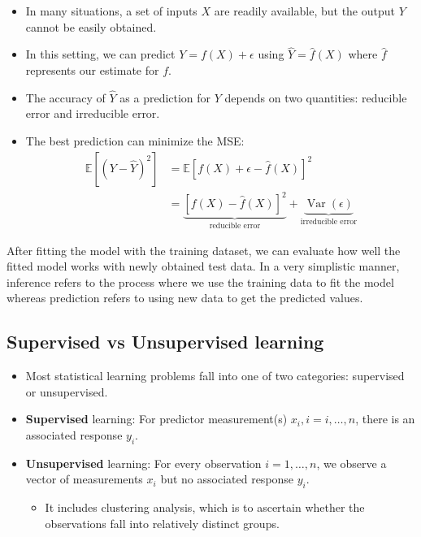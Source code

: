 \documentclass[11pt]{article}
\newcommand{\opn}{\operatorname}
\begin{document}
\begin{itemize}
  \item In many situations, a set of inputs $X$ are readily available, but the output $Y$ cannot be easily obtained.
  \item In this setting, we can predict $Y=f\left(X\right) + \epsilon$ using $\widehat{Y}=\hat{f}\left(X\right)$ where $\hat{f}$ represents our estimate for $f$.
  \item The accuracy of $\widehat{Y}$ as a prediction for $Y$ depends on two quantities: reducible error and irreducible error.
  \item The best prediction can minimize the MSE:
  \begin{align*}
    \mathbb{E}\left[\left(Y-\widehat{Y}\right)^{2}\right] &= \mathbb{E}\left[f\left(X\right)+\epsilon - \hat{f}\left(X\right)\right]^{2} \\
    &= \underbrace{\left[f\left(X\right) - \hat{f}\left(X\right)\right]^{2}}_{\text{reducible error}} + \underbrace{\opn{Var}\left(\epsilon\right)}_{\text{irreducible error}}
  \end{align*}
\end{itemize}
After fitting the model with the training dataset, we can evaluate how well the fitted model works with newly obtained test data. In a very simplistic manner, inference refers to the process where we use the training data to fit the model whereas prediction refers to using new data to get the predicted values.

\subsection{Supervised vs Unsupervised learning}
\begin{itemize}
  \item Most statistical learning problems fall into one of two categories: supervised or unsupervised.
  \item \textbf{Supervised} learning: For predictor measurement(s) $x_{i}, i = i, \ldots , n$, there is an associated response $y_{i}$.
  \item \textbf{Unsupervised} learning: For every observation $i = 1, \ldots , n$, we observe a vector of measurements $x_{i}$ but no associated response $y_{i}$.
  \begin{itemize}\item It includes clustering analysis, which is to ascertain whether the observations fall into relatively distinct groups.  \end{itemize}
\end{itemize}
\end{document}
